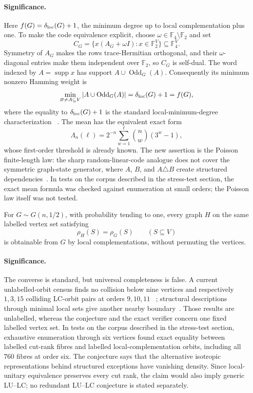 \paragraph{Significance.}
Here $f(G)=\delta_{\rm loc}(G)+1$, the minimum degree up to local
complementation plus one.  To make the code equivalence explicit, choose
$\omega\in\mathbb F_4\setminus\mathbb F_2$ and set
\[
 C_G=\{x(A_G+\omega I):x\in\mathbb F_2^V\}\subseteq\mathbb F_4^V.
\]
Symmetry of $A_G$ makes the rows trace-Hermitian orthogonal, and their
$\omega$-diagonal entries make them independent over $\mathbb F_2$, so
$C_G$ is self-dual.  The word indexed by $A=\operatorname{supp}x$ has
support $A\cup\operatorname{Odd}_G(A)$.  Consequently its minimum nonzero
Hamming weight is
\[
 \min_{\varnothing\ne A\subseteq V}|A\cup\operatorname{Odd}_G(A)|
 =\delta_{\rm loc}(G)+1=f(G),
\]
where the equality to $\delta_{\rm loc}(G)+1$ is the standard
local-minimum-degree characterization
~\cite{JavelleMhallaPerdrix12,CattaneoPerdrix15}.  The mean has the
equivalent exact form
\[
 \Lambda_n(\ell)=2^{-n}\sum_{w=1}^{\ell}\binom nw(3^w-1),
\]
whose first-order threshold is already known.  The new assertion is the
Poisson finite-length law: the sharp random-linear-code analogue does not
cover the symmetric graph-state generator, where $A$, $B$, and
$A\triangle B$ create structured dependencies~\cite{HaoEtAl22}.  In tests on the corpus described in the stress-test section, the exact mean formula
was checked against enumeration at small orders; the Poisson law itself was
not tested.

\begin{conjecture}\label{as4}
For $G\sim G(n,1/2)$, with probability tending to one, every graph $H$ on
the same labelled vertex set satisfying
\[
 \rho_H(S)=\rho_G(S)\qquad(S\subseteq V)
\]
is obtainable from $G$ by local complementations, without permuting the
vertices.
\end{conjecture}

\paragraph{Significance.}
The converse is standard, but universal completeness is false.  A current
unlabelled-orbit census finds no collision below nine vertices and respectively
$1,3,15$ colliding LC-orbit pairs at orders $9,10,11$
~\cite{BurchardtDeJongVandre24}; structural descriptions through minimal local
sets give another nearby boundary~\cite{ClaudetPerdrix25}.  Those results are
unlabelled, whereas the conjecture and the exact verifier concern one fixed
labelled vertex set.  In tests on the corpus described in the stress-test section, exhaustive
enumeration through six vertices found exact equality between labelled
cut-rank fibres and labelled local-complementation orbits, including all
$760$ fibres at order six.  The conjecture says that the
alternative isotropic representations behind structured exceptions have
vanishing density.  Since local-unitary equivalence preserves every cut rank,
the claim would also imply generic LU--LC; no redundant LU--LC conjecture is
stated separately.

